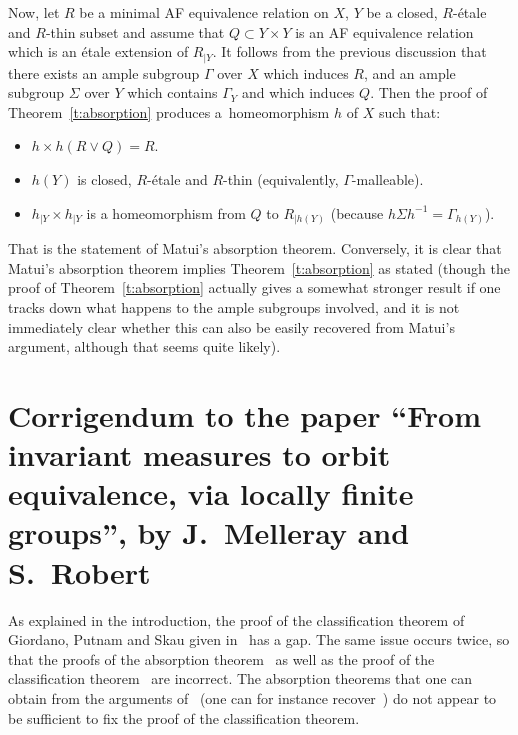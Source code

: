 \documentclass[AHL,Unicode]{cedram}
\begin{document}
Now, let $R$ be a minimal AF equivalence relation on $X$, $Y$ be a closed, $R$-étale and $R$-thin subset and assume that $Q \subset Y \times Y$ is an AF equivalence relation which is an étale extension of $R_{|Y}$. It follows from the previous discussion that there exists an ample subgroup $\Gamma$ over $X$ which induces $R$, and an ample subgroup $\Sigma$ over $Y$ which contains $\Gamma_Y$ and which induces $Q$. Then the proof of Theorem~\ref{t:absorption} produces a~homeomorphism $h$ of $X$ such that:
\begin{itemize}
\item $h \times h (R \vee Q)= R$.
\item $h(Y)$ is closed, $R$-étale and $R$-thin (equivalently, $\Gamma$-malleable).
\item $h_{|Y} \times h_{|Y}$ is a homeomorphism from $Q$ to $R_{|h(Y)}$ (because $h \Sigma h^{-1}=\Gamma_{h(Y)}$).
\end{itemize}

That is the statement of Matui's absorption theorem. Conversely, it is clear that Matui's absorption theorem implies Theorem~\ref{t:absorption} as stated (though the proof of Theorem~\ref{t:absorption} actually gives a somewhat stronger result if one tracks down what happens to the ample subgroups involved, and it is not immediately clear whether this can also be easily recovered from Matui's argument, although that seems quite likely).


\appendix
\section{Corrigendum to the paper ``From invariant measures to orbit equivalence, via locally finite groups'', by J.~Melleray and S.~Robert}
\setcounter{cdrthm}{0}


As explained in the introduction, the proof of the classification theorem of Giordano, Putnam and Skau given in~\cite{Melleray2023} has a gap. The same issue occurs twice, so that the proofs of the absorption theorem~\cite[Theorem~5.1]{Melleray2023} as well as the proof of the classification theorem~\cite[Theorem~5.2]{Melleray2023} are incorrect. The absorption theorems that one can obtain from the arguments of~\cite{Melleray2023} (one can for instance recover~\cite[Theorem~6.4]{Melleray2023}) do not appear to be sufficient to fix the proof of the classification theorem.
\end{document}
